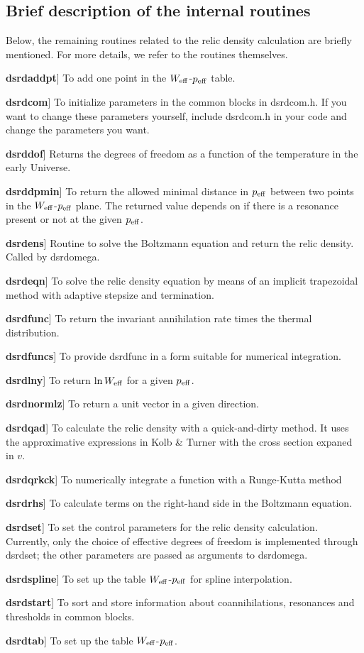 \documentclass[a4paper,10pt,oneside]{book}
\newenvironment{brief-subs}{\begin{list}{}{\setlength{\labelwidth}{2.5 cm}
\setlength{\labelsep}{0.5 cm} \setlength{\leftmargin}{3.0 cm}
\setlength{\itemsep}{0.5 ex} \setlength{\parsep}{0.0 cm}
\setlength{\topsep}{0.0 cm} \setlength{\parskip}{0.0 cm}}
\bsub{\rmfamily Routine} {\bfseries Purpose}
\raisebox{-0.5ex}{}\hrule
}{\end{list}
\hrule
\smallskip
}
\newcommand{\bitem}[1]{\makebox[2.5 cm][l]{\ftb{#1}}}
\newcommand{\bsub}[1]{\item[\bitem{#1}]}
\newcommand{\ft}[1]{\textsf{#1}}
\newcommand{\ftb}[1]{{\bfseries \sffamily #1}}
\begin{document}
\subsection{Brief description of the internal routines}

Below, the remaining routines related to the relic density calculation
are briefly mentioned. For more details, we refer to the routines
themselves.

\begin{brief-subs}
\bsub{dsrdaddpt}
  To add one point in the $W_{\rm eff}$-$p_{\rm eff}$ table.
\bsub{dsrdcom}
  To initialize parameters in the common blocks in \ft{dsrdcom.h}. If
  you want to change these parameters yourself, include \ft{dsrdcom.h}
  in your code and change the parameters you want.
\bsub{dsrddof}
  Returns the degrees of freedom as a
  function of the temperature in the early Universe.
\bsub{dsrddpmin}
  To return the allowed minimal distance in $p_{\rm
  eff}$ between two points in the $W_{\rm eff}$-$p_{\rm eff}$ plane.
  The returned value depends on if there is a resonance present or not
  at the given $p_{\rm eff}$.
\bsub{dsrdens} Routine to solve the Boltzmann equation and return the relic density. Called by \ft{dsrdomega}.
\bsub{dsrdeqn}
  To solve the relic density equation by means of an
  implicit trapezoidal method with adaptive stepsize and termination.
\bsub{dsrdfunc}
  To return the invariant annihilation rate times the
  thermal distribution.
\bsub{dsrdfuncs}
  To provide \ft{dsrdfunc} in a form suitable for
  numerical integration.
\bsub{dsrdlny}
  To return $\ln W_{\rm eff}$ for a given $p_{\rm
  eff}$.
\bsub{dsrdnormlz}
  To return a unit vector in a given direction.
\bsub{dsrdqad}
  To calculate the relic density with a
  quick-and-dirty method. It uses the approximative expressions in
  Kolb \& Turner with the cross section expaned in $v$.
\bsub{dsrdqrkck}
  To numerically integrate a function with a
  Runge-Kutta method
\bsub{dsrdrhs}
  To calculate terms on the right-hand side in the
  Boltzmann equation.
\bsub{dsrdset}
  To set the control parameters for the relic density calculation. Currently, only the choice of effective degrees of freedom is implemented through \ft{dsrdset}; the other parameters are passed as arguments to \ft{dsrdomega}.
\bsub{dsrdspline}
  To set up the table $W_{\rm eff}$-$p_{\rm eff}$ for
  spline interpolation.
\bsub{dsrdstart}
  To sort and store information about coannihilations,
  resonances and thresholds in common blocks.
\bsub{dsrdtab}
  To set up the table $W_{\rm eff}$-$p_{\rm eff}$.

\end{brief-subs}
\end{document}
